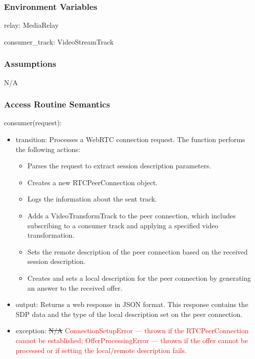\documentclass[12pt, titlepage]{article}
\newcommand{\rt}[1]{\textcolor{red}{#1}}
\begin{document}
\subsubsection{Environment Variables}
relay: MediaRelay

consumer\_track: VideoStreamTrack

\subsubsection{Assumptions}
N/A

\subsubsection{Access Routine Semantics}

\noindent consumer(request):
\begin{itemize}
\item transition: Processes a WebRTC connection request. The function performs the
  following actions:
  \begin{itemize}
  \item Parses the request to extract session description parameters.
  \item Creates a new RTCPeerConnection object.
  \item Logs the information about the sent track.
  \item Adds a VideoTransformTrack to the peer connection, which includes subscribing
    to a consumer track and applying a specified video transformation.
  \item Sets the remote description of the peer connection based on the received session description.
  \item Creates and sets a local description for the peer connection by generating an answer to the received offer.
  \end{itemize}
\item output: Returns a web response in JSON format. This response contains the SDP
  data and the type of the local description set on the peer connection.
\item exception: \sout{N/A} \rt{ConnectionSetupError --- thrown if the RTCPeerConnection cannot be established; OfferProcessingError --- thrown if the offer cannot be processed or if setting the local/remote description fails.}
\end{itemize}
\end{document}
